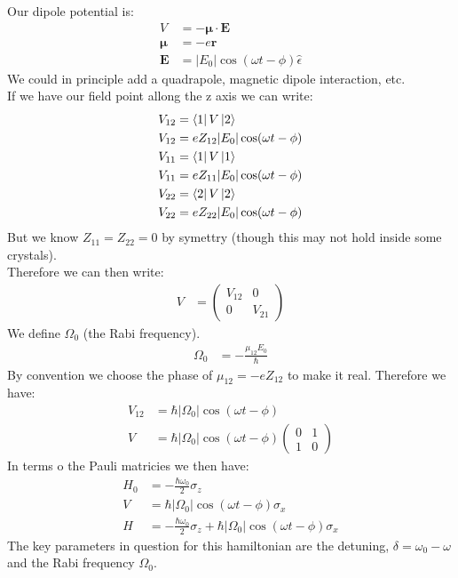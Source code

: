 Our dipole potential is:
\begin{align*}
	V &= -\bm{\mu}\cdot\bm{E} \\
	\bm{\mu} &= -e\bm{r} \\
	\bm{E} &= |E_0| \cos(\omega t-\phi)\hat{\epsilon}
\end{align*}
We could in principle add a quadrapole, magnetic dipole interaction, etc.\\
If we have our field point allong the z axis we can write:
\begin{align*}
	V_{12} &= \bra{1} V\ket{2} \\
	V_{12} &= e Z_{12} |E_0| \cos(\omega t -\phi) \\
	V_{11} &= \bra{1} V\ket{1} \\
	V_{11} &= e Z_{11} |E_0| \cos(\omega t -\phi) \\
	V_{22} &= \bra{2} V\ket{2} \\
	V_{22} &= e Z_{22} |E_0| \cos(\omega t -\phi)
\end{align*}
But we know $Z_{11} = Z_{22} = 0$ by symettry (though this may not hold inside some crystals). \\
Therefore we can then write:
\begin{align*}
	V &= \begin{pmatrix} V_{12} & 0 \\ 0 & V_{21} \end{pmatrix}
\end{align*}
We define $\Omega_0$ (the Rabi frequency).
\begin{align*}
	\Omega_0 &= -\frac{\mu_{12} E_0}{\hbar}
\end{align*}
By convention we choose the phase of $\mu_{12} = -e Z_{12}$ to make it real. Therefore we have:
\begin{align*}
	V_{12} &= \hbar |\Omega_0| \cos (\omega t -\phi) \\
	V &= \hbar |\Omega_0| \cos (\omega t - \phi)\begin{pmatrix}
		0 & 1 \\
		1 & 0
      \end{pmatrix}
\end{align*}
In terms o the Pauli matricies we then have:
\begin{align*}
	H_0 &= -\frac{\hbar\omega_0}{2} \sigma_z \\
	V &= \hbar |\Omega_0|\cos(\omega t - \phi) \sigma_x \\
	H &= -\frac{\hbar\omega_0}{2} \sigma_z + \hbar |\Omega_0|\cos(\omega t - \phi) \sigma_x
\end{align*}
The key parameters in question for this hamiltonian are the detuning, $\delta=\omega_0-\omega$ and the Rabi frequency $\Omega_0$. \\
